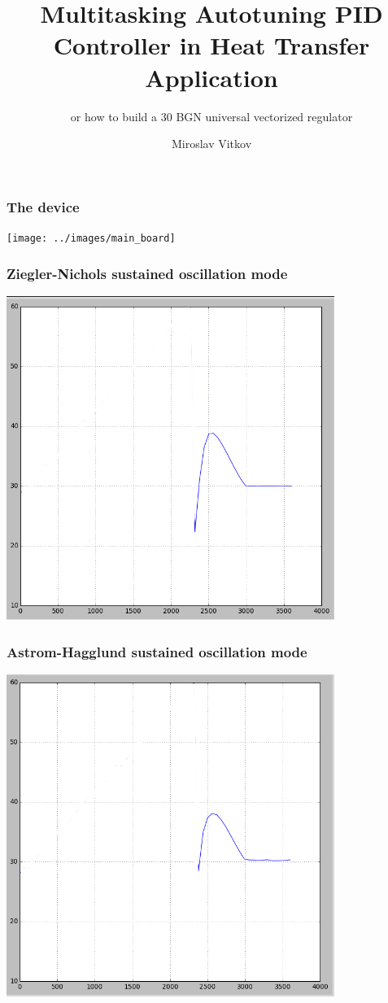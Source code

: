 \documentclass{beamer}
\title{Multitasking Autotuning PID Controller in Heat Transfer Application}
\subtitle{or how to build a 30 BGN universal vectorized regulator}
\author{Miroslav Vitkov}
\institute{ELDE, Technical University-Sofia}
\begin{document}
\frame{\titlepage}


\begin{frame}
\frametitle{The device}
\texttt{[image: ../images/main\_board]}~
\end{frame}

\begin{frame}
\frametitle{Ziegler-Nichols sustained oscillation mode}
\includegraphics[width=0.8\textwidth]{../images/exp_gain100}~
\end{frame}

\begin{frame}
\frametitle{Astrom-Hagglund sustained oscillation mode}
\includegraphics[width=0.8\textwidth]{../images/exp_relay}~
\end{frame}
\end{document}
